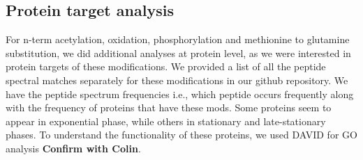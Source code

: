 \documentclass[12pt]{article}
\begin{document}
\subsection{Protein target analysis} 

For n-term acetylation, oxidation, phosphorylation and methionine to glutamine substitution, we did additional analyses at protein level, as we were interested in protein targets of these modifications. We provided a list of all the peptide spectral matches separately for these modifications in our github repository. We have the peptide spectrum frequencies i.e., which peptide occurs frequently along with the frequency of proteins that have these mods. Some proteins seem to appear in exponential phase, while others in stationary and late-stationary phases. To understand the functionality of these proteins, we used DAVID for GO analysis \textbf{Confirm with Colin}.




\end{document}
